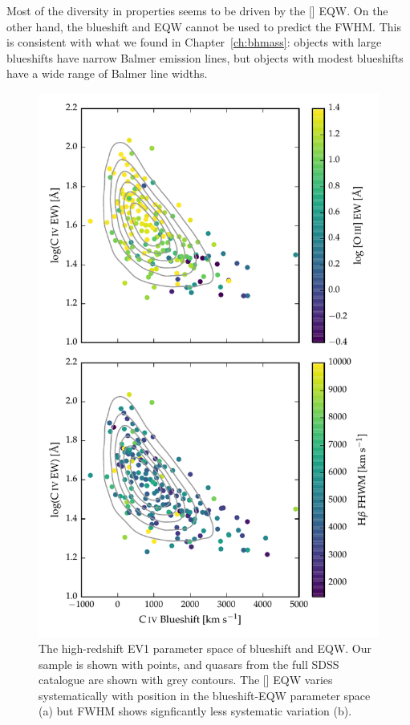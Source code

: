 Most of the diversity in  properties seems to be driven by the [] \ac{EQW}. 
On the other hand, the  blueshift and \ac{EQW} cannot be used to predict the \hb FWHM. 
This is consistent with what we found in Chapter~\ref{ch:bhmass}: objects with large  blueshifts have narrow Balmer emission lines, but objects with modest  blueshifts have a wide range of Balmer line widths. 


\begin{figure}
    \includegraphics[width=\columnwidth]{figures/chapter04/ev1.pdf} 
    \caption{The high-redshift \ac{EV1} parameter space of  blueshift and \ac{EQW}. Our sample is shown with points, and quasars from the full \ac{SDSS} catalogue are shown with grey contours. The [] EQW varies systematically with position in the  blueshift-\ac{EQW} parameter space (a) but \hb FWHM shows signficantly less systematic variation (b).}      
    \label{fig:ev1}
\end{figure}


